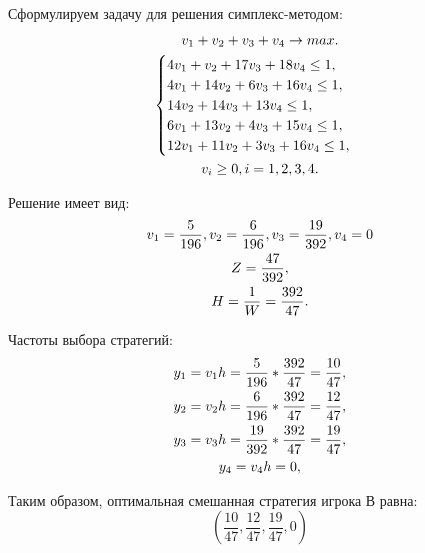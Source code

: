 \documentclass[12pt,a4paper,oneside]{extarticle}
\begin{document}
    Сформулируем задачу для решения симплекс-методом:
    \begin{gather}
        v_1+v_2+v_3+v_4 \rightarrow max. \notag \\
        \begin{cases}
            4v_1 + v_2 + 17v_3 + 18v_4 \leq 1, \notag \\
            4v_1 + 14v_2 + 6v_3 + 16v_4 \leq 1, \notag \\
            14v_2 + 14v_3 + 13v_4 \leq 1, \notag \\
            6v_1 + 13v_2 + 4v_3 + 15v_4  \leq 1, \notag \\
            12v_1 + 11v_2 + 3v_3 + 16v_4  \leq 1, \notag \\
        \end{cases} \notag \\
        v_i \geq 0, i=1,2,3,4.\notag
    \end{gather} 

    Решение имеет вид:
    \begin{gather}
        v_1 = \frac{5}{196}, v_2 = \frac{6}{196}, v_3 = \frac{19}{392}, v_4= 0 \notag \\
        Z = \frac{47}{392}, \notag \\
        H = \frac{1}{W} = \frac{392}{47}. \notag
    \end{gather}

        Частоты выбора стратегий:
    \begin{gather}
        y_1 = v_1h = \frac{5}{196} * \frac{392}{47} = \frac{10}{47}, \notag \\
        y_2 = v_2h = \frac{6}{196} * \frac{392}{47} = \frac{12}{47}, \notag \\
        y_3 = v_3h = \frac{19}{392} * \frac{392}{47} = \frac{19}{47}, \notag \\
        y_4 = v_4h = 0, \notag 
    \end{gather}

    Таким образом, оптимальная смешанная стратегия игрока В равна: 
    $$(\frac{10}{47}, \frac{12}{47}, \frac{19}{47}, 0)$$
\end{document}
